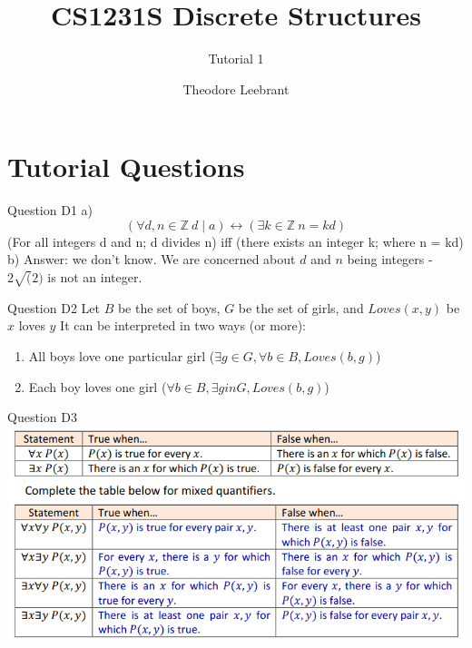 \documentclass[10pt]{beamer}
\title{CS1231S Discrete Structures}
\subtitle{Tutorial 1}
\date{}
\author{Theodore Leebrant}
\institute{Tutorial Group 3A}
\begin{document}
\maketitle


\section[Tutorial Questions (and Photo Taking)]{Tutorial Questions}

\begin{frame}[fragile]{Question D1}
a)
    $$(\forall d, n \in \mathbb{Z} \ d \mid a) \leftrightarrow (\exists k \in \mathbb{Z} \ n = kd)$$
    (For all integers d and n; d divides n) iff (there exists an integer k; where n = kd) \\

b)
Answer: we don't know. We are concerned about $d$ and $n$ being integers - $2\sqrt(2)$ is not an integer.
\end{frame}

\begin{frame}[fragile]{Question D2}
Let $B$ be the set of boys, $G$ be the set of girls, and $Loves(x,y)$ be $x$ loves $y$
It can be interpreted in two ways (or more):
\begin{enumerate}
  \item All boys love one particular girl ($\exists g \in G, \forall b \in B, Loves(b, g)$)
  \item Each boy loves one girl ($\forall b \in B, \exists g in G, Loves(b, g)$)
\end{enumerate}
\end{frame}

\begin{frame}[fragile]{Question D3}
\includegraphics[width = \textwidth]{ttb.png}
\end{frame}
\end{document}
